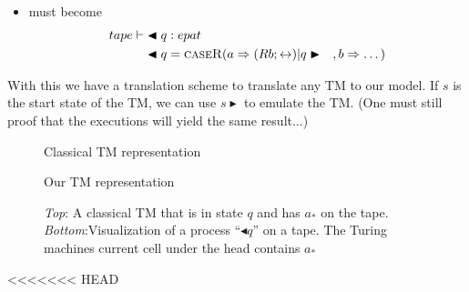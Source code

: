 \documentclass{article}
\begin{document}
\begin{enumerate}
\begin{itemize}
			\item {} must become  
			\begin{align*}
			tape \vdash &\blacktriangleleft q : epat \\
			&\blacktriangleleft q = \textsc{caseR}( a \Rightarrow (Rb;\leftrightarrow) \vert q \blacktriangleright \quad, b \Rightarrow \dots ) 
			\end{align*}
		\end{itemize}
	\end{enumerate}
	
	
	With this we have a translation scheme to translate any TM to our model.
	If \(s\) is the start state of the TM, we can use \(s \blacktriangleright\) to emulate the TM.
	(One must still proof that the executions will yield the same result...)
	
	
	
	\begin{figure}
		\centering
		{\footnotesize Classical TM representation}
		
		\vspace{3em}
		
		
		{\footnotesize Our TM representation}
		\caption{\textit{Top}: A classical TM that is in state \(q\) and has \(a_*\) on the tape. \textit{Bottom}:Visualization of a process ``$\blacktriangleleft q$'' on a tape. The Turing machines current cell under the head contains \(a_*\)}
	\end{figure}
<<<<<<< HEAD
	
\end{document}
